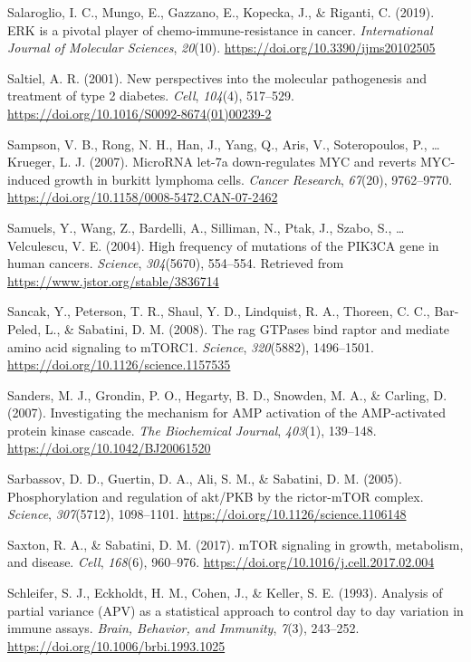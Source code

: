\documentclass[12pt,openany]{book}
\begin{document}
\hypertarget{ref-Salaroglio2019}{}
Salaroglio, I. C., Mungo, E., Gazzano, E., Kopecka, J., \& Riganti, C.
(2019). ERK is a pivotal player of chemo-immune-resistance in cancer.
\emph{International Journal of Molecular Sciences}, \emph{20}(10).
\url{https://doi.org/10.3390/ijms20102505}

\hypertarget{ref-Saltiel2001}{}
Saltiel, A. R. (2001). New perspectives into the molecular pathogenesis
and treatment of type 2 diabetes. \emph{Cell}, \emph{104}(4), 517--529.
\url{https://doi.org/10.1016/S0092-8674(01)00239-2}

\hypertarget{ref-Sampson2007}{}
Sampson, V. B., Rong, N. H., Han, J., Yang, Q., Aris, V., Soteropoulos,
P., \ldots{} Krueger, L. J. (2007). MicroRNA let-7a down-regulates MYC
and reverts MYC-induced growth in burkitt lymphoma cells. \emph{Cancer
Research}, \emph{67}(20), 9762--9770.
\url{https://doi.org/10.1158/0008-5472.CAN-07-2462}

\hypertarget{ref-Samuels2004}{}
Samuels, Y., Wang, Z., Bardelli, A., Silliman, N., Ptak, J., Szabo, S.,
\ldots{} Velculescu, V. E. (2004). High frequency of mutations of the
PIK3CA gene in human cancers. \emph{Science}, \emph{304}(5670),
554--554. Retrieved from \url{https://www.jstor.org/stable/3836714}

\hypertarget{ref-Sancak2008}{}
Sancak, Y., Peterson, T. R., Shaul, Y. D., Lindquist, R. A., Thoreen, C.
C., Bar-Peled, L., \& Sabatini, D. M. (2008). The rag GTPases bind
raptor and mediate amino acid signaling to mTORC1. \emph{Science},
\emph{320}(5882), 1496--1501.
\url{https://doi.org/10.1126/science.1157535}

\hypertarget{ref-Sanders2007}{}
Sanders, M. J., Grondin, P. O., Hegarty, B. D., Snowden, M. A., \&
Carling, D. (2007). Investigating the mechanism for AMP activation of
the AMP-activated protein kinase cascade. \emph{The Biochemical
Journal}, \emph{403}(1), 139--148.
\url{https://doi.org/10.1042/BJ20061520}

\hypertarget{ref-Sarbassov2005}{}
Sarbassov, D. D., Guertin, D. A., Ali, S. M., \& Sabatini, D. M. (2005).
Phosphorylation and regulation of akt/PKB by the rictor-mTOR complex.
\emph{Science}, \emph{307}(5712), 1098--1101.
\url{https://doi.org/10.1126/science.1106148}

\hypertarget{ref-Saxton2017}{}
Saxton, R. A., \& Sabatini, D. M. (2017). mTOR signaling in growth,
metabolism, and disease. \emph{Cell}, \emph{168}(6), 960--976.
\url{https://doi.org/10.1016/j.cell.2017.02.004}

\hypertarget{ref-Schleifer1993}{}
Schleifer, S. J., Eckholdt, H. M., Cohen, J., \& Keller, S. E. (1993).
Analysis of partial variance (APV) as a statistical approach to control
day to day variation in immune assays. \emph{Brain, Behavior, and
Immunity}, \emph{7}(3), 243--252.
\url{https://doi.org/10.1006/brbi.1993.1025}
\end{document}
